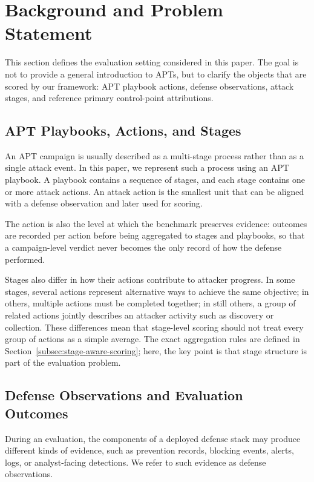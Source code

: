 \section{Background and Problem Statement}
\label{sec:background}

This section defines the evaluation setting considered in this paper. The goal is not to provide a general introduction to APTs, but to clarify the objects that are scored by our framework: APT playbook actions, defense observations, attack stages, and reference primary control-point attributions.

\subsection{APT Playbooks, Actions, and Stages}
\label{subsec:apt-playbooks-actions-stages}

An APT campaign is usually described as a multi-stage process rather than as a single attack event. In this paper, we represent such a process using an APT playbook. A playbook contains a sequence of stages, and each stage contains one or more attack actions. An attack action is the smallest unit that can be aligned with a defense observation and later used for scoring.

The action is also the level at which the benchmark preserves evidence: outcomes are recorded per action before being aggregated to stages and playbooks, so that a campaign-level verdict never becomes the only record of how the defense performed.

Stages also differ in how their actions contribute to attacker progress. In some stages, several actions represent alternative ways to achieve the same objective; in others, multiple actions must be completed together; in still others, a group of related actions jointly describes an attacker activity such as discovery or collection. These differences mean that stage-level scoring should not treat every group of actions as a simple average. The exact aggregation rules are defined in Section~\ref{subsec:stage-aware-scoring}; here, the key point is that stage structure is part of the evaluation problem.

\subsection{Defense Observations and Evaluation Outcomes}
\label{subsec:defense-observations-outcomes}

During an evaluation, the components of a deployed defense stack may produce different kinds of evidence, such as prevention records, blocking events, alerts, logs, or analyst-facing detections. We refer to such evidence as defense observations.

